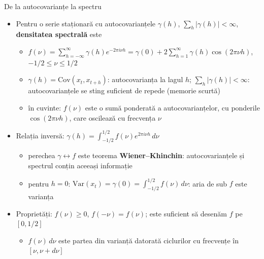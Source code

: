 \begin{frame}{De la autocovarianțe la spectru}
\itemsize{\footnotesize}
\begin{itemize}
    \item Pentru o serie staționară cu autocovarianțele $\gamma(h)$, $\sum_h|\gamma(h)| < \infty$, \textbf{densitatea spectrală} este
    \begin{itemize}
        \item $f(\nu) = \sum_{h=-\infty}^{\infty}\gamma(h)e^{-2\pi i\nu h} = \gamma(0) + 2\sum_{h=1}^{\infty}\gamma(h)\cos(2\pi\nu h)$, $-1/2 \le \nu \le 1/2$
        \item $\gamma(h) = \mathrm{Cov}(x_t, x_{t+h})$: autocovarianța la lagul $h$; $\sum_h|\gamma(h)| < \infty$: autocovarianțele se sting suficient de repede (memorie scurtă)
        \item în cuvinte: $f(\nu)$ este o sumă ponderată a autocovarianțelor, cu ponderile $\cos(2\pi\nu h)$, care oscilează cu frecvența $\nu$
    \end{itemize}
    \item Relația inversă: $\gamma(h) = \int_{-1/2}^{1/2} f(\nu)e^{2\pi i\nu h}\,d\nu$
    \begin{itemize}
        \item perechea $\gamma \leftrightarrow f$ este teorema \textbf{Wiener--Khinchin}: autocovarianțele și spectrul conțin aceeași informație
        \item pentru $h = 0$: $\mathrm{Var}(x_t) = \gamma(0) = \int_{-1/2}^{1/2} f(\nu)\,d\nu$: aria de sub $f$ este varianța
    \end{itemize}
    \item Proprietăți: $f(\nu) \ge 0$, $f(-\nu) = f(\nu)$; este suficient să desenăm $f$ pe $[0, 1/2]$
    \begin{itemize}
        \item $f(\nu)\,d\nu$ este partea din varianță datorată ciclurilor cu frecvențe în $[\nu, \nu + d\nu]$
    \end{itemize}
\end{itemize}
\end{frame}

